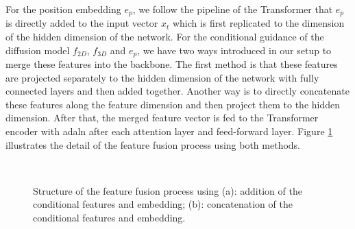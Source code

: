 \documentclass[12pt,DIV14,BCOR12mm,a4paper,footinclude=false,headinclude,parskip=half-,twoside,openright,cleardoublepage=empty,toc=index,bibliography=totoc,listof=totoc]{scrreprt}
\numberwithin{equation}{chapter}
\begin{document}
For the position embedding $e_{p}$, we follow the pipeline of the Transformer that $e_{p}$ is directly added to the input vector $x_{t}$ which is first replicated to the dimension of the hidden dimension of the network. For the conditional guidance of the diffusion model $f_{2D}$, $f_{3D}$ and $e_{p}$, we have two ways introduced in our setup to merge these features into the backbone. The first method is that these features are projected separately to the hidden dimension of the network with fully connected layers and then added together. Another way is to directly concatenate these features along the feature dimension and then project them to the hidden dimension. After that, the merged feature vector is fed to the Transformer encoder with \gls{adaln} after each attention layer and feed-forward layer. Figure \ref{img:fuse} illustrates the detail of the feature fusion process using both methods.
\begin{figure}[h]
  \centering
   \\
  \centering
  \caption{Structure of the feature fusion process using (a): addition of the conditional features and embedding; (b): concatenation of the conditional features and embedding.}
  \label{img:fuse}
\end{figure}
\end{document}
